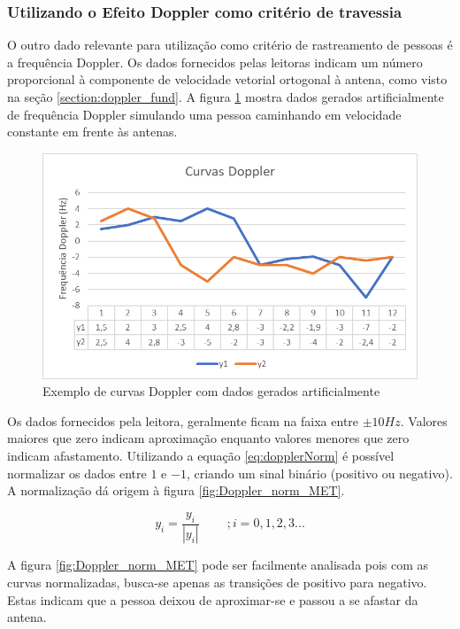 \subsubsection{Utilizando o Efeito Doppler como critério de travessia} \label{section:doppler_met}
 
  O outro dado relevante para utilização como critério de rastreamento de pessoas é a frequência Doppler. Os dados fornecidos pelas leitoras indicam um número proporcional à componente de velocidade vetorial ortogonal à antena, como visto na seção \ref{section:doppler_fund}. A figura \ref{fig:doppler_MET} mostra dados gerados artificialmente de frequência Doppler simulando uma pessoa caminhando em velocidade constante em frente às antenas.
 
   \begin{figure}[H]
    \centering
    \includegraphics[width=0.8\linewidth]{figs/Metodologia/image003.png}
    \caption{Exemplo de curvas Doppler com dados gerados artificialmente}
    \label{fig:doppler_MET}
\end{figure}

    Os dados fornecidos pela leitora, geralmente ficam na faixa entre $\pm 10 Hz$. Valores maiores que zero indicam aproximação enquanto valores menores que zero indicam afastamento. Utilizando a equação \ref{eq:dopplerNorm} é possível normalizar os dados entre $1$ e $-1$, criando um sinal binário (positivo ou negativo). A normalização dá origem à figura \ref{fig:Doppler_norm_MET}.
    
    \begin{equation}
        y_i = \frac{y_i}{|y_i|} \ \ \ \ \ \ \ \ \ \ ; i = 0, 1, 2, 3 ...
        \label{eq:dopplerNorm}
    \end{equation}

A figura \ref{fig:Doppler_norm_MET} pode ser facilmente analisada pois com as curvas normalizadas, busca-se apenas as transições de positivo para negativo. Estas indicam que a pessoa deixou de aproximar-se e passou a se afastar da antena.
 
